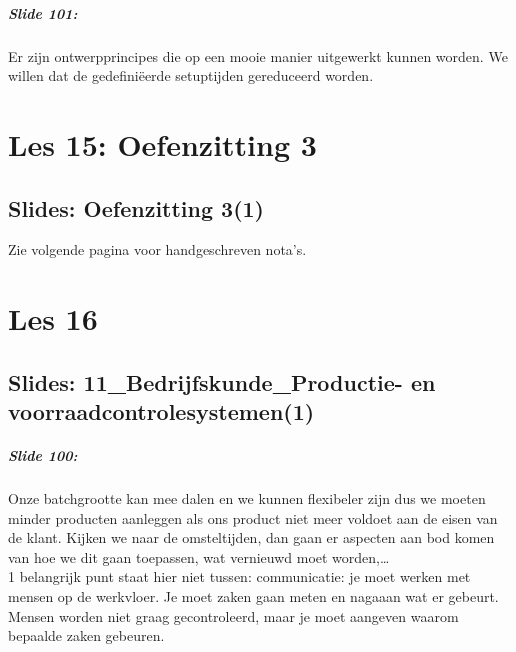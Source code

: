 \documentclass[10pt,a4paper]{report}
\begin{document}
\paragraph{Slide 101:} Er zijn ontwerpprincipes die op een mooie manier uitgewerkt kunnen worden. We willen dat de gedefini\"eerde setuptijden gereduceerd worden.

\chapter{Les 15: Oefenzitting 3}
\section{Slides: Oefenzitting 3(1)}
Zie volgende pagina voor handgeschreven nota's.

 

\chapter{Les 16}
\section{Slides: 11\_Bedrijfskunde\_Productie- en voorraadcontrolesystemen(1)}

\paragraph{Slide 100:} Onze batchgrootte kan mee dalen en we kunnen flexibeler zijn dus we moeten minder producten aanleggen als ons product niet meer voldoet aan de eisen van de klant.
Kijken we naar de omsteltijden, dan gaan er aspecten aan bod komen van hoe we dit gaan toepassen, wat vernieuwd moet worden,…\\
1 belangrijk punt staat hier niet tussen: communicatie: je moet werken met mensen op de werkvloer. Je moet zaken gaan meten en nagaaan wat er gebeurt. Mensen worden niet graag gecontroleerd, maar je moet aangeven waarom bepaalde zaken gebeuren.
\end{document}
